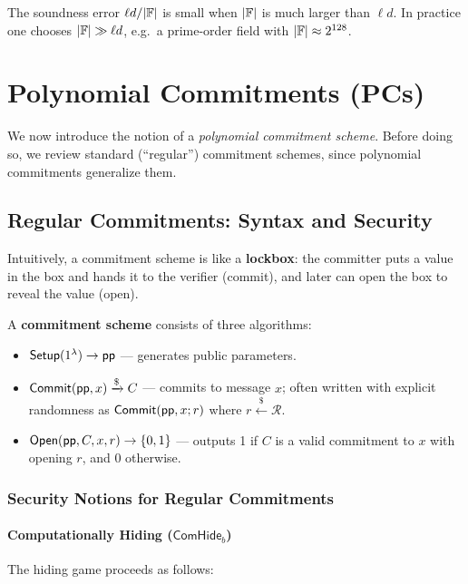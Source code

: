 \documentclass[11pt]{article}
\begin{document}
\begin{remark}
The soundness error $\ell d / |\mathbb{F}|$ is small when $|\mathbb{F}|$ is much larger than $\ell d$.  In practice one chooses $|\mathbb{F}| \gg \ell d$, e.g.\ a prime-order field with $|\mathbb{F}| \approx 2^{128}$.
\end{remark}

\section{Polynomial Commitments (PCs)}

We now introduce the notion of a \emph{polynomial commitment scheme}.  Before doing so, we review standard (``regular'') commitment schemes, since polynomial commitments generalize them.

\subsection{Regular Commitments: Syntax and Security}

Intuitively, a commitment scheme is like a \textbf{lockbox}: the committer puts a value in the box and hands it to the verifier (commit), and later can open the box to reveal the value (open).

\begin{definitionbox}
A \textbf{commitment scheme} consists of three algorithms:
\begin{itemize}
  \item $\mathsf{Setup}(1^\lambda) \to \mathsf{pp}$ --- generates public parameters.
  \item $\mathsf{Commit}(\mathsf{pp}, x) \xrightarrow{\$} C$ --- commits to message $x$; often written with explicit randomness as $\mathsf{Commit}(\mathsf{pp}, x; r)$ where $r \xleftarrow{\$} \mathcal{R}$.
  \item $\mathsf{Open}(\mathsf{pp}, C, x, r) \to \{0,1\}$ --- outputs 1 if $C$ is a valid commitment to $x$ with opening $r$, and 0 otherwise.
\end{itemize}
\end{definitionbox}

\subsubsection{Security Notions for Regular Commitments}

\paragraph{Computationally Hiding ($\mathsf{ComHide}_b$)}
The hiding game proceeds as follows:
\end{document}
